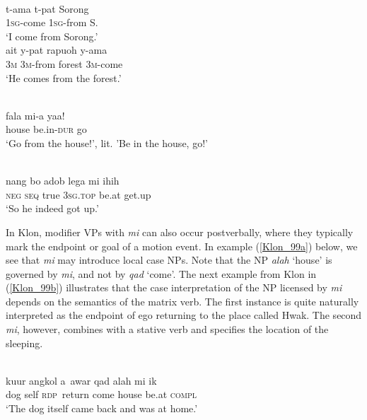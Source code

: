 \ea \label{Maybrat_60}
\\
\ea
\gll t-ama t-pat Sorong \\
1\textsc{sg}-come 1\textsc{sg}-from S. \\
\glft `I come from Sorong.' \\ 
\ex
\gll ait y-pat rapuoh y-ama \\ 
3\textsc{m} 3\textsc{m}-from forest 3\textsc{m}-come \\
\glft `He comes from the forest.'\\ 
\z
\z

\ea \label{Abui_24}
\\
\gll fala mi-a yaa! \\
house be.in-\textsc{dur} go \\
\glft `Go from the house!', lit. 'Be in the house, go!’\\
\z

\ea \label{Klon_48}
\\
\gll nang bo adob lega mi ihih \\
\textsc{neg} \textsc{seq} true 3\textsc{sg}.\textsc{top} be.at get.up \\
\glft `So he indeed got up.'\\ 
\z

In Klon, modifier VPs with \textit{mi} can also occur postverbally, where they typically mark the endpoint or goal of a motion event. In example (\ref{Klon_99a}) below, we see that \textit{mi} may introduce local case NPs. Note that the NP \textit{alah} `house' is governed by \textit{mi}, and not by \textit{qad} `come'. The next example from Klon in (\ref{Klon_99b}) illustrates that the case interpretation of the NP licensed by \textit{mi} depends on the semantics of the matrix verb. The first instance is quite naturally interpreted as the endpoint of ego returning to the place called Hwak. The second \textit{mi}, however, combines with a stative verb and specifies the location of the sleeping.

\ea \label{Klon_99a}
\\
\gll kuur angkol a~awar qad alah mi ik \\
dog self \textsc{rdp}~return come house be.at \textsc{compl} \\
\glft `The dog itself came back and was at home.'\\ 
\z

